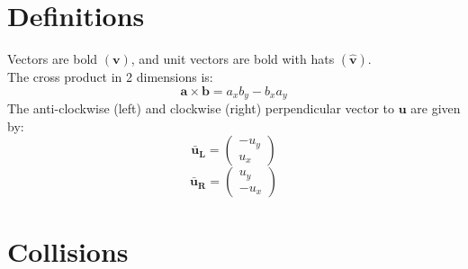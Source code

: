 \documentclass[12pt]{article}
\begin{document}
\section{Definitions}
Vectors are bold $(\mathbf{v})$, and unit vectors are bold with hats $(\mathbf{\hat{v}})$.\\
The cross product in 2 dimensions is:
\begin{equation}
	\label{eq:cross_prod_2d}
	\mathbf{a}\times \mathbf{b} = a_xb_y - b_x a_y
\end{equation}
The anti-clockwise (left) and clockwise (right) perpendicular vector to $\mathbf u$ are given by:
\begin{equation}
	\mathbf{\bar u_L} = \left(\begin{matrix}
		-u_y\\
		u_x
\end{matrix}\right)
\end{equation}
\begin{equation}
	\mathbf{\bar u_R} = \left(\begin{matrix}
		u_y\\
		-u_x
\end{matrix}\right)
\end{equation}
\section{Collisions}
\end{document}
